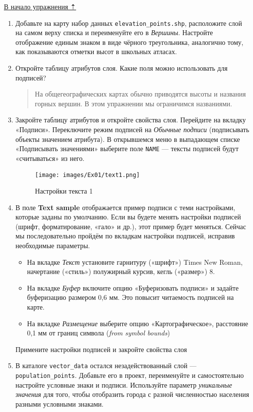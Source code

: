 \documentclass[
  12pt,
]{book}
\providecommand{\tightlist}{%
  \setlength{\itemsep}{0pt}\setlength{\parskip}{0pt}}
\begin{document}
\protect\hyperlink{map-design-general}{В начало упражнения ⇡}

\begin{enumerate}
\def\labelenumi{\arabic{enumi}.}
\item
  Добавьте на карту набор данных \texttt{elevation\_points.shp}, расположите слой на самом верху списка и переименуйте его в \emph{Вершины}. Настройте отображение единым знаком в виде чёрного треугольника, аналогично тому, как показываются отметки высот в школьных атласах.
\item
  Откройте таблицу атрибутов слоя. Какие поля можно использовать для подписей?

  \begin{quote}
  На общегеографических картах обычно приводятся высоты и названия горных вершин. В этом упражнении мы ограничимся названиями.
  \end{quote}
\item
  Закройте таблицу атрибутов и откройте свойства слоя. Перейдите на вкладку «Подписи». Переключите режим подписей на \emph{Обычные подписи} (подписывать объекты значением атрибута). В открывшемся меню в выпадающем списке «Подписывать значениями» выберите поле \texttt{NAME} --- тексты подписей будут «считываться» из него.

  \begin{figure}
  \centering
  \texttt{[image: images/Ex01/text1.png]}
  \caption{Настройки текста 1}
  \end{figure}
\item
  В поле \textbf{Text sample} отображается пример подписи с теми настройками, которые заданы по умолчанию. Если вы будете менять настройки подписей (шрифт, форматирование, «гало» и др.), этот пример будет меняться. Сейчас мы последовательно пройдём по вкладкам настройки подписей, исправив необходимые параметры.

  \begin{itemize}
  \tightlist
  \item
    На вкладке \emph{Текст} установите гарнитуру («шрифт») Times New Roman, начертание («стиль») полужирный курсив, кегль («размер») 8.
  \item
    На вкладке \emph{Буфер} включите опцию «Буферизовать подписи» и задайте буферизацию размером 0,6 мм. Это повысит читаемость подписей на карте.
  \item
    На вкладке \emph{Размещение} выберите опцию «Картографическое», расстояние 0,1 мм от границ символа (\emph{from symbol bounds})
  \end{itemize}

  Примените настройки подписей и закройте свойства слоя
\item
  В каталоге \texttt{vector\_data} остался незадействованный слой --- \texttt{population\_points}. Добавьте его в проект, переименуйте и самостоятельно настройте условные знаки и подписи. Используйте параметр \emph{уникальные значения} для того, чтобы отобразить города с разной численностью населения разными условными знаками.
\end{enumerate}
\end{document}

